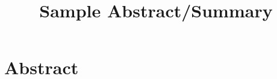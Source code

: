 \documentclass{article}
\title{Sample Abstract/Summary}
\author{}
\date{}
\begin{document}
\maketitle

\section*{Abstract}
\lipsum[1]

\vspace{0.5cm}

\lipsum[3]
\end{document}
